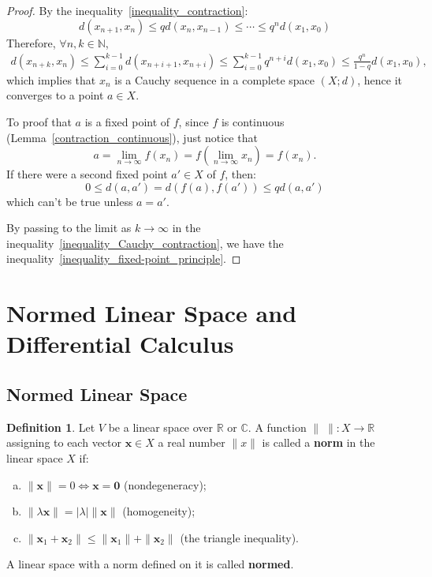 \documentclass{article}
\theoremstyle{plain}
\theoremstyle{definition}
\newtheorem{dfn}{Definition}[section] %
\begin{document}
\begin{proof}
By the inequality~\ref{inequality_contraction}:
\[
d ( x_{n+1}, x_n) \leq q d( x_n, x_{n-1})
\leq \cdots 
\leq q^n d( x_1, x_0)
\]
Therefore, $\forall n, k \in \mathbb{N}$, 
\begin{align}\label{inequality_Cauchy_contraction}
	d ( x_{n+k}, x_n) \leq 
	\sum^{k-1}_{i=0} d( x_{n+i+1}, x_{n+i}) \leq
	\sum^{k-1}_{i=0} q^{n+i} d( x_1, x_0) \leq
	\frac{q^n}{1-q} d( x_1, x_0),
\end{align}
which implies that ${ x_n}$ is a Cauchy sequence in a complete space $(X;d)$, hence it converges to a point $a \in X$.

To proof that $a$ is a fixed point of $f$, since $f$ is continuous (Lemma~\ref{contraction_continuous}), just notice that 
\[
	a = \lim_{n\to \infty} f(x_n) = 
	f( \lim_{n\to \infty} x_n) = f( x_n).
\]
If there were a second fixed point $a'\in X$ of $f$, then:
\[
	0 \leq d( a, a')  = d( f(a), f(a') ) \leq q d( a, a')
\]
which can't be true unless $a = a'$. 

By passing to the limit as $k \to \infty$ in the inequality~\ref{inequality_Cauchy_contraction}, we have the inequality~\ref{inequality_fixed-point_principle}.
\end{proof}

\section{Normed Linear Space and Differential Calculus}
\subsection{Normed Linear Space}
\begin{dfn}
Let $V$ be a linear space over $\mathbb{R}$ or $\mathbb{C}$. A function $\|\;\|: X\to \mathbb{R}$ assigning to each vector $\boldsymbol{x}\in X$ a real number $\|x\|$ is called a \textbf{norm} in the linear space $X$ if:
\begin{enumerate}[a)]
	\item 
	$\|\boldsymbol{x}\|=0\Leftrightarrow \boldsymbol{x}=\boldsymbol{0}$ (nondegeneracy);
	\item
	$\|\lambda \boldsymbol{x}\| = |\lambda|\|\boldsymbol{x}\|$ (homogeneity);
	\item
	$\|\boldsymbol{x}_1+\boldsymbol{x}_2\|\leq 
	\|\boldsymbol{x}_1\|+\|\boldsymbol{x}_2\|$ (the triangle inequality).
\end{enumerate}	
A linear space with a norm defined on it is called \textbf{normed}.
\end{dfn}
\printindex
\end{document}
